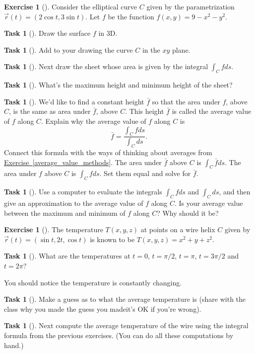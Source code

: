 \documentclass[10pt,]{book}
\theoremstyle{plain}
\theoremstyle{definition}
\theoremstyle{definition}
\theoremstyle{definition}
\theoremstyle{definition}
\newtheorem{exploration}[project]{Exercise}
\newtheorem{task}[project]{Task}
\theoremstyle{definition}
\numberwithin{equation}{section}
\begin{document}
\begin{exploration}[]\label{Average_Value_intro}
Consider the elliptical curve \(C\) given by the parametrization \(\vec r(t) = (2\cos t, 3\sin t)\). Let \(f\) be the function \(f(x,y)=9-x^2-y^2\).%
\begin{task}[]\label{task-548}
Draw the surface \(f\) in 3D.%
\begin{task}[]\label{task-549}
Add to your drawing the curve \(C\) in the \(xy\) plane.%
\end{task}
\begin{task}[]\label{task-550}
Next draw the sheet whose area is given by the integral \(\int_C f ds\).%
\end{task}
\end{task}
\begin{task}[]\label{task-551}
What's the maximum height and minimum height of the sheet?  %
\end{task}
\begin{task}[]\label{task-552}
We'd like to find a constant height \(\bar f\) so that the area under \(f\), above \(C\), is the same as area under \(\bar f\), above \(C\). This height \(\bar f\) is called the average value of \(f\) along \(C\). Explain why the average value of \(f\) along \(C\) is%
\begin{equation*}
\bar f = \frac{\int_C f ds}{\int_C ds}.
\end{equation*}
Connect this formula with the ways of thinking about averages from \hyperref[average_value_methods]{Exercise~\ref{average_value_methods}}. The area under \(\bar f\) above \(C\) is \(\int_C \bar f ds\). The area under \(f\) above \(C\) is \(\int_C f ds\). Set them equal and solve for \(\bar f\).%
%
\end{task}
\begin{task}[]\label{task-553}
Use a computer to evaluate the integrals \(\int_C f ds\) and \(\int_C ds\), and then give an approximation to the average value of \(f\) along \(C\). Is your average value between the maximum and minimum of \(f\) along \(C\)? Why should it be?%
\end{task}
\end{exploration}
\begin{exploration}[]\label{exploration-215}
The temperature \(T(x,y,z)\) at points on a wire helix \(C\) given by \(\vec r(t) = (\sin t, 2t, \cos t)\) is known to be \(T(x,y,z)=x^2+y+z^2\).%
\begin{task}[]\label{task-554}
What are the temperatures at \(t=0\), \(t=\pi/2\), \(t=\pi\), \(t=3\pi/2\) and \(t=2\pi\)?%
\end{task}
You should notice the temperature is constantly changing.%
\begin{task}[]\label{task-555}
Make a guess as to what the average temperature is (share with the class why you made the guess you made\textemdash{}it's OK if you're wrong).%
\end{task}
\begin{task}[]\label{task-556}
Next compute the average temperature of the wire using the integral formula from the previous exercises. (You can do all these computations by hand.)%
\end{task}
\end{exploration}
\end{document}
